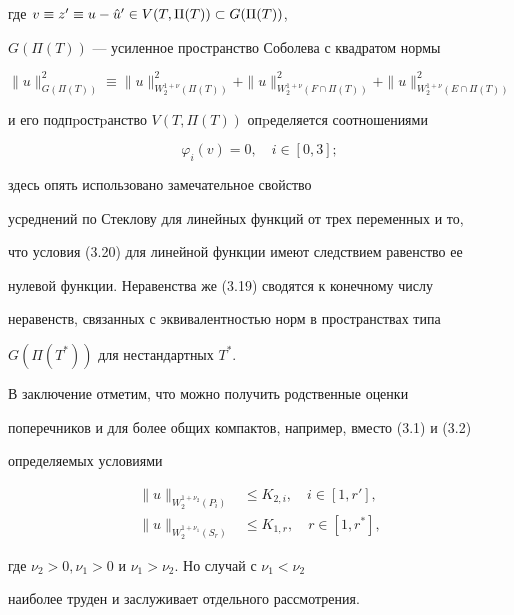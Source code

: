где $v\equiv z'\equiv u-\Hat u'\in V(T,\Pi(T))\subset G(\Pi(T))$,


$G(\Pi(T))$ --- усиленное пространство Соболева с квадратом нормы


$$


\|u\|^2_{G(\Pi(T))}\equiv \|u\|^2_{W_2^{1+\nu}(\Pi(T))}+


\|u\|^2_{W_2^{1+\nu}(F\cap\Pi(T))}+\|u\|^2_{W_2^{1+\nu}(E\cap\Pi(T))}


$$


и его подпpостpанство $V(T,\Pi(T))$ опpеделяется соотношениями


\begin{equation}


\varphi_i(v)=0,\quad i\in[0,3];


\end{equation}


здесь опять использовано замечательное свойство


усреднений по Стеклову для линейных функций от трех переменных и то,


что условия (3.20) для линейной функции имеют следствием равенство ее


нулевой функции. Неравенства же (3.19) сводятся к конечному числу


неравенств, связанных с эквивалентностью норм в простра\-нствах типа


$G(\Pi(T^*))$ для нестандартных $T^*$.





В заключение отметим, что можно получить родственные оценки


поперечников и для более общих компактов, например, вместо (3.1) и (3.2)


определяемых условиями





\begin{align*}


\|u\|_{W_2^{1+\nu_2}(P_i)} &\le K_{2,i},\quad i\in[1,r'],\\


%


\|u\|_{W_2^{1+\nu_1}(S_r)} &\le K_{1,r},\quad r\in[1,r^{*}],


\end{align*}


где $\nu_2>0,\nu_1>0$ и $\nu_1>\nu_2$. Но случай с $\nu_1<\nu_2$


наиболее труден и заслуживает отдельного рассмотрения.








